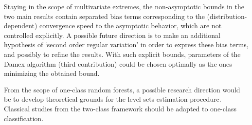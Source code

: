 %
Staying in the scope of multivariate extremes, the non-asymptotic bounds in the two main results contain separated bias terms corresponding to the (distribution-dependent) convergence speed to the asymptotic behavior, which are not controlled explicitly.
A possible future direction is to make an additional hypothesis
of  `second order regular variation'  \citep[see \emph{e.g.}][]{deHaan1996}
in order to express these bias terms, and possibly to refine the results.
With such explicit bounds, parameters of the Damex algorithm (third contribution) could be chosen optimally as the ones minimizing the obtained bound.

From the scope of one-class random forests, a possible research direction would be to develop theoretical grounds for the level sets estimation procedure. Classical studies from the two-class framework should be adapted to one-class classification.
